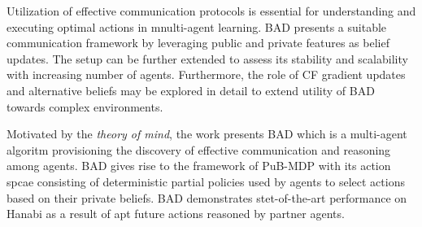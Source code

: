 \documentclass[11pt,letterpaper]{article}
\begin{document}
Utilization of effective communication protocols is essential for understanding and executing optimal actions in mnulti-agent learning. BAD presents a suitable communication framework by leveraging public and private features as belief updates. The setup can be further extended to assess its stability and scalability with increasing number of agents. Furthermore, the role of CF gradient updates and alternative beliefs may be explored in detail to extend utility of BAD towards complex environments.

Motivated by the \textit{theory of mind}, the work presents BAD which is a multi-agent algoritm provisioning the discovery of effective communication and reasoning among agents. BAD gives rise to the framework of PuB-MDP with its action spcae consisting of deterministic partial policies used by agents to select actions based on their private beliefs. BAD demonstrates stet-of-the-art performance on Hanabi as a result of apt future actions reasoned by partner agents. 
\end{document}

